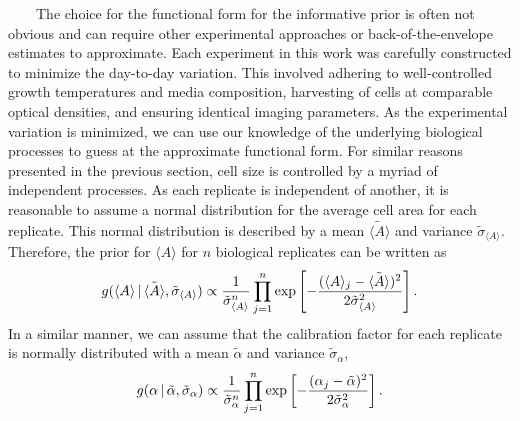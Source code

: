 ~~~~The
choice
for
the
functional
form
for
the
informative
prior
is
often
not
obvious
and
can
require
other
experimental
approaches
or
back-of-the-envelope
estimates
to
approximate.
Each
experiment
in
this
work
was
carefully
constructed
to
minimize
the
day-to-day
variation.
This
involved
adhering
to
well-controlled
growth
temperatures
and
media
composition,
harvesting
of
cells
at
comparable
optical
densities,
and
ensuring
identical
imaging
parameters.
As the
experimental
variation
is
minimized,
we can
use
our
knowledge
of the
underlying
biological
processes
to
guess
at the
approximate
functional
form.
For
similar
reasons
presented
in the
previous
section,
cell
size
is
controlled
by a
myriad
of
independent
processes.
As
each
replicate
is
independent
of
another,
it is
reasonable
to
assume
a
normal
distribution
for
the
average
cell
area
for
each
replicate.
This
normal
distribution
is
described
by a
mean
\(\tilde{\langle A \rangle}\)
and
variance
\(\tilde{\sigma}_{\langle A \rangle}\).
Therefore,
the
prior
for
\(\langle A \rangle\)
for
\(n\)
biological
replicates
can be
written
as
\begin{equation}
g(\langle A \rangle\, \vert\, \tilde{\langle A \rangle}, \tilde{\sigma}_{\langle A \rangle}) \propto {1 \over \tilde{\sigma}_{\langle A \rangle}^n}\prod\limits_{j=1}^{n}\exp\left[-{(\langle A \rangle_j - \tilde{\langle A \rangle})^2 \over 2 \tilde{\sigma}_{\langle A \rangle}^2}\right].
\label{eq:hyperprior_area}\end{equation}
In a
similar
manner,
we can
assume
that
the
calibration
factor
for
each
replicate
is
normally
distributed
with a
mean
\(\tilde{\alpha}\)
and
variance
\(\tilde{\sigma}_\alpha\),
\begin{equation}
g(\alpha\,\vert\,\tilde{\alpha}, \tilde{\sigma}_\alpha) \propto {1 \over \tilde{\sigma}_\alpha^n}\prod\limits_{j=1}^n \exp\left[-{(\alpha_j - \tilde{\alpha})^2 \over 2\tilde{\sigma}_\alpha^2}\right].
\label{eq:hyperprior_alpha}\end{equation}

